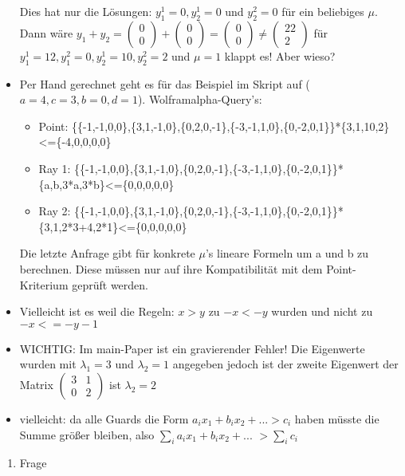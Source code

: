 \begin{itemize}
		Dies hat nur die Lösungen: $y_1^1=0, y_2^1=0$ und $y_2^2=0$ für ein beliebiges $\mu$.\newline
		Dann wäre $y_1+y_2= \begin{pmatrix} 0 \\ 0 \end{pmatrix} + \begin{pmatrix} 0 \\ 0 \end{pmatrix}= \begin{pmatrix} 0 \\ 0 \end{pmatrix} \ne \begin{pmatrix} 22 \\ 2 \end{pmatrix}$
		\newline \answer für $y_1^1=12, y_1^2=0, y_2^1=10, y_2^2=2$ und $\mu=1$ klappt es! Aber wieso?
	\item
		Per Hand gerechnet geht es für das Beispiel im Skript auf ($a=4,c=3,b=0,d=1$).
		Wolframalpha-Query's:
		\begin{itemize}
			\item Point: \{\{-1,-1,0,0\},\{3,1,-1,0\},\{0,2,0,-1\},\{-3,-1,1,0\},\{0,-2,0,1\}\}*\{3,1,10,2\}<=\{-4,0,0,0,0\}
			\item Ray 1: \{\{-1,-1,0,0\},\{3,1,-1,0\},\{0,2,0,-1\},\{-3,-1,1,0\},\{0,-2,0,1\}\}*\{a,b,3*a,3*b\}<=\{0,0,0,0,0\}
			\item Ray 2: \{\{-1,-1,0,0\},\{3,1,-1,0\},\{0,2,0,-1\},\{-3,-1,1,0\},\{0,-2,0,1\}\}*\{3,1,2*3+4,2*1\}<=\{0,0,0,0,0\}
		\end{itemize}
		\answer Die letzte Anfrage gibt für konkrete $\mu$'s lineare Formeln um a und b zu berechnen. Diese müssen nur auf ihre Kompatibilität mit dem Point-Kriterium geprüft werden. 
	\item Vielleicht ist es weil die Regeln: $x > y$ zu $-x < -y$ wurden und nicht zu $-x <= -y-1$
	\item WICHTIG: Im main-Paper ist ein gravierender Fehler! Die Eigenwerte wurden mit $\lambda_1 = 3 $ und  $\lambda_2 =1$ angegeben jedoch ist der zweite Eigenwert der Matrix $ \begin{pmatrix} 3 & 1 \\ 0 & 2 \end{pmatrix}$ ist $ \lambda_2 = 2$
	\item vielleicht: da alle Guards die Form $a_ix_1+b_ix_2+...>c_i$  haben müsste die Summe größer bleiben, also $\sum_{i} a_ix_1+b_ix_2+...$ $> \sum_{i} c_i$
\end{itemize}

\begin{enumerate}
	\item Frage
\end{enumerate}